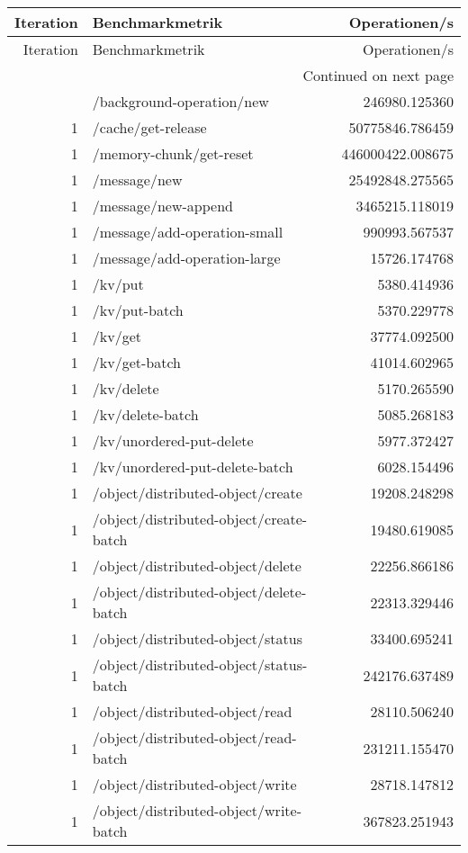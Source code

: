 \begin{longtable}{rlr}
\toprule
Iteration & Benchmarkmetrik & Operationen/s \\
\midrule
\endfirsthead
\toprule
Iteration & Benchmarkmetrik & Operationen/s \\
\midrule
\endhead
\midrule
\multicolumn{3}{r}{Continued on next page} \\
\midrule
\endfoot
\bottomrule
\endlastfoot
1 & /background-operation/new & 246980.125360 \\
1 & /cache/get-release & 50775846.786459 \\
1 & /memory-chunk/get-reset & 446000422.008675 \\
1 & /message/new & 25492848.275565 \\
1 & /message/new-append & 3465215.118019 \\
1 & /message/add-operation-small & 990993.567537 \\
1 & /message/add-operation-large & 15726.174768 \\
1 & /kv/put & 5380.414936 \\
1 & /kv/put-batch & 5370.229778 \\
1 & /kv/get & 37774.092500 \\
1 & /kv/get-batch & 41014.602965 \\
1 & /kv/delete & 5170.265590 \\
1 & /kv/delete-batch & 5085.268183 \\
1 & /kv/unordered-put-delete & 5977.372427 \\
1 & /kv/unordered-put-delete-batch & 6028.154496 \\
1 & /object/distributed-object/create & 19208.248298 \\
1 & /object/distributed-object/create-batch & 19480.619085 \\
1 & /object/distributed-object/delete & 22256.866186 \\
1 & /object/distributed-object/delete-batch & 22313.329446 \\
1 & /object/distributed-object/status & 33400.695241 \\
1 & /object/distributed-object/status-batch & 242176.637489 \\
1 & /object/distributed-object/read & 28110.506240 \\
1 & /object/distributed-object/read-batch & 231211.155470 \\
1 & /object/distributed-object/write & 28718.147812 \\
1 & /object/distributed-object/write-batch & 367823.251943 \\

\end{longtable}

